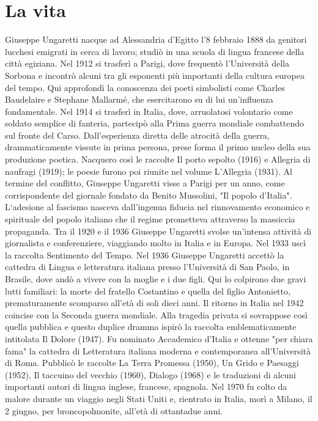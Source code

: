 \section{La vita}
Giuseppe Ungaretti nacque ad Alessandria d’Egitto l’8 febbraio 1888 da genitori lucchesi emigrati in cerca di lavoro; studiò in una scuola di lingua francese della città egiziana.
Nel 1912 si trasferì a Parigi, dove frequentò l’Università della Sorbona e incontrò alcuni tra gli esponenti più importanti della cultura europea del tempo. Qui approfondì la conoscenza dei poeti simbolisti come Charles Baudelaire e Stephane Mallarmé, che esercitarono su di lui un’influenza fondamentale.
Nel 1914 si trasferì in Italia, dove, arruolatosi volontario come soldato semplice di fanteria, partecipò alla Prima guerra mondiale combattendo sul fronte del Carso.  Dall’esperienza diretta delle atrocità della guerra, drammaticamente vissute in prima persona, prese forma il primo nucleo della sua produzione poetica. Nacquero così le raccolte Il porto sepolto (1916) e Allegria di naufragi (1919); le poesie furono poi riunite nel volume L’Allegria (1931).
Al termine del conflitto, Giuseppe Ungaretti visse a Parigi per un anno, come corrispondente del giornale fondato da Benito Mussolini, "Il popolo d’Italia". L‘adesione al fascismo nasceva dall’ingenua fiducia nel rinnovamento economico e spirituale del popolo italiano che il regime prometteva attraverso la massiccia propaganda.
Tra il 1920 e il 1936 Giuseppe Ungaretti svolse un’intensa attività di giornalista e conferenziere, viaggiando molto in Italia e in Europa. Nel 1933 uscì la raccolta Sentimento del Tempo.
Nel 1936 Giuseppe Ungaretti accettò la cattedra di Lingua e letteratura italiana presso l’Università di San Paolo, in Brasile, dove andò a vivere con la moglie e i due figli. Qui lo colpirono due gravi lutti familiari: la morte del fratello Costantino e quella del figlio Antonietto, prematuramente scomparso all’età di soli dieci anni.
Il ritorno in Italia nel 1942 coincise con la Seconda guerra mondiale. Alla tragedia privata si sovrappose così quella pubblica e questo duplice dramma ispirò la raccolta emblematicamente intitolata Il Dolore (1947). Fu nominato Accademico d’Italia e ottenne "per chiara fama" la cattedra di Letteratura italiana moderna e contemporanea all’Università di Roma.
Pubblicò le raccolte La Terra Promessa (1950), Un Grido e Paesaggi (1952), Il taccuino del vecchio (1960), Dialogo (1968) e le traduzioni di alcuni importanti autori di lingua inglese, francese, spagnola.
Nel 1970 fu colto da malore durante un viaggio negli Stati Uniti e, rientrato in Italia, morì a Milano, il 2 giugno, per broncopolmonite, all’età di ottantadue anni.


